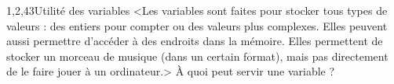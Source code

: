 \begin{quiz}[title={Notion de variable}]
\vspace{-\baselineskip}
\begin{quizquestion}[b]{1,2,4}{3}{Utilité des variables}
<Les variables sont faites pour stocker tous types de valeurs : des entiers pour compter ou des valeurs plus complexes. Elles peuvent aussi permettre d'accéder à des endroits dans la mémoire. Elles permettent de stocker un morceau de musique (dans un certain format), mais pas directement de le faire jouer à un ordinateur.>
À quoi peut servir une variable ?
\end{quizquestion}
\end{quiz}


